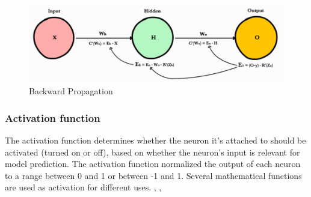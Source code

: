 \begin{figure}[H]
    \centering
    \includegraphics[width=0.8\linewidth]{tex/img/backward_propagation.PNG}
    \caption{Backward Propagation}
    \label{fig:backward_propagation}
\end{figure}
\subsubsection{Activation function}
The activation function determines whether the neuron it’s attached to should be activated (turned on or off), based on whether the neuron’s input is relevant for model prediction. The activation function normalized the output of each neuron to a range between 0 and 1 or between -1 and 1. Several mathematical functions are used as activation for different uses. \cite{sharma2017activation}, \cite{apicella2021survey}, \cite{bfortuner_mlglossary}

